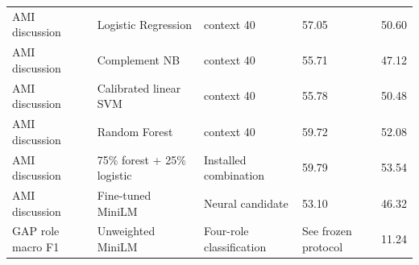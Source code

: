 \documentclass[journal]{IEEEtran}
\begin{document}
\begin{table}[t]
\begin{tabular}{p{}p{}p{}p{}p{}}
{\raggedright AMI discussion\par} & {\raggedright Logistic Regression\par} & {\raggedright context 40\par} & {\raggedright 57.05\par} & {\raggedright 50.60\par} \\
{\raggedright AMI discussion\par} & {\raggedright Complement NB\par} & {\raggedright context 40\par} & {\raggedright 55.71\par} & {\raggedright 47.12\par} \\
{\raggedright AMI discussion\par} & {\raggedright Calibrated linear SVM\par} & {\raggedright context 40\par} & {\raggedright 55.78\par} & {\raggedright 50.48\par} \\
{\raggedright AMI discussion\par} & {\raggedright Random Forest\par} & {\raggedright context 40\par} & {\raggedright 59.72\par} & {\raggedright 52.08\par} \\
{\raggedright AMI discussion\par} & {\raggedright 75\% forest + 25\% logistic\par} & {\raggedright Installed combination\par} & {\raggedright 59.79\par} & {\raggedright 53.54\par} \\
{\raggedright AMI discussion\par} & {\raggedright Fine-tuned MiniLM\par} & {\raggedright Neural candidate\par} & {\raggedright 53.10\par} & {\raggedright 46.32\par} \\
{\raggedright GAP role macro F1\par} & {\raggedright Unweighted MiniLM\par} & {\raggedright Four-role classification\par} & {\raggedright See frozen protocol\par} & {\raggedright 11.24\par} \\

\end{tabular}
\end{table}
\end{document}
